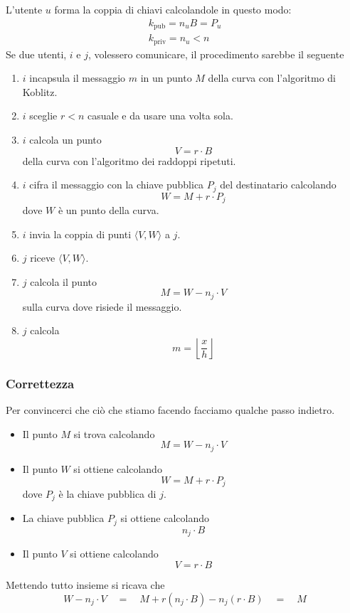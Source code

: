 L'utente $u$ forma la coppia di chiavi calcolandole in questo modo:
\[
	\begin{matrix}
		k_\text{pub} = n_u B = P_u \\
		k_\text{priv} = n_u < n
	\end{matrix}
\]
Se due utenti, $i$ e $j$, volessero comunicare, il procedimento sarebbe il seguente
\begin{enumerate}
	\item $i$ incapsula il messaggio $m$ in un punto $M$ della curva con l'algoritmo di Koblitz.
	\item $i$ sceglie $r < n$ casuale e da usare una volta sola.
	\item $i$ calcola un punto
	      \[ V = r \cdot B \]
	      della curva con l'algoritmo dei raddoppi ripetuti.
	\item $i$ cifra il messaggio con la chiave pubblica $P_j$ del destinatario calcolando
	      \[ W = M + r \cdot P_j \]
	      dove $W$ \`e un punto della curva.
	\item $i$ invia la coppia di punti $\langle V, W \rangle$ a $j$.
	\item $j$ riceve $\langle V, W \rangle$.
	\item $j$ calcola il punto
	      \[ M = W - n_j \cdot V \]
	      sulla curva dove risiede il messaggio.
	\item $j$ calcola
	      \[ m = \left\lfloor \frac{x}{h} \right\rfloor \]
\end{enumerate}

\subsubsection{Correttezza}
Per convincerci che ci\`o che stiamo facendo facciamo qualche passo indietro.
\begin{itemize}
	\item Il punto $M$ si trova calcolando
	      \[ M = W - n_j \cdot V \]
	\item Il punto $W$ si ottiene calcolando
	      \[ W = M + r \cdot P_j \]
	      dove $P_j$ \`e la chiave pubblica di $j$.
	\item La chiave pubblica $P_j$ si ottiene calcolando
	      \[ n_j \cdot B \]
	\item Il punto $V$ si ottiene calcolando
	      \[ V = r \cdot B \]
\end{itemize}
Mettendo tutto insieme si ricava che
\[ W - n_j \cdot V \quad = \quad M + r (n_j \cdot B) - n_j (r \cdot B) \quad = \quad M \]


